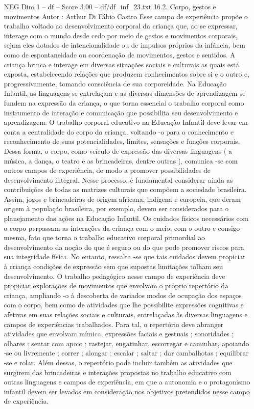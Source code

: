 \begin{textsample}{NEG Dim 1 – df – Score 3.00 – df/df\_inf\_23.txt}  \label{ex:f1_neg_161}
16.2.
Corpo, gestos e movimentos Autor : Arthur Di Fábio Castro Esse campo de experiência propõe o trabalho voltado ao desenvolvimento corporal da criança que, ao se expressar, interage com o mundo desde cedo por meio de gestos e movimentos corporais, sejam eles dotados de intencionalidade ou de impulsos próprios da infância, bem como de espontaneidade ou coordenação de movimentos, gestos e sentidos.
A criança brinca e interage em diversas situações sociais e culturais as quais está exposta, estabelecendo relações que produzem conhecimentos sobre si e o outro e, progressivamente, tomando consciência de sua corporeidade.
Na Educação Infantil, as linguagens se entrelaçam e as diversas dimensões de aprendizagem se fundem na expressão da criança, o que torna essencial o trabalho corporal como instrumento de interação e comunicação que possibilita seu desenvolvimento e aprendizagem.
O trabalho corporal educativo na Educação Infantil deve levar em conta a centralidade do corpo da criança, voltando -o para o conhecimento e reconhecimento de suas potencialidades, limites, sensações e funções corporais.
Dessa forma, o corpo, como veículo de expressão das diversas linguagens ( a música, a dança, o teatro e as brincadeiras, dentre outras ), comunica -se com outros campos de experiência, de modo a promover possibilidades de desenvolvimento integral.
Nesse processo, é fundamental considerar ainda as contribuições de todas as matrizes culturais que compõem a sociedade brasileira.
Assim, jogos e brincadeiras de origem africana, indígena e europeia, que deram origem à população brasileira, por exemplo, devem ser considerados para o planejamento das ações na Educação Infantil.
Os cuidados físicos necessários com o corpo perpassam as interações da criança com o meio, com o outro e consigo mesma, fato que torna o trabalho educativo corporal primordial ao desenvolvimento da noção do que é seguro ou do que pode promover riscos para sua integridade física.
No entanto, ressalta -se que tais cuidados devem propiciar à criança condições de expressão sem que supostas limitações tolham seu desenvolvimento.
O trabalho pedagógico nesse campo de experiência deve propiciar explorações de movimentos que envolvam o próprio repertório da criança, ampliando -o à descoberta de variados modos de ocupação dos espaços com o corpo, bem como de atividades que lhe possibilite expressões cognitivas e afetivas em suas relações sociais e culturais, entrelaçadas às diversas linguagens e campos de experiências trabalhados.
Para tal, o repertório deve abranger atividades que envolvam mímica, expressões faciais e gestuais ; sonoridades ; olhares ; sentar com apoio ; rastejar, engatinhar, escorregar e caminhar, apoiando -se ou livremente ; correr ; alongar ; escalar ; saltar ; dar cambalhotas ; equilibrar -se e rolar.
Além dessas, o repertório pode incluir também as atividades que surgirem das brincadeiras e interações propostas no trabalho educativo com outras linguagens e campos de experiência, em que a autonomia e o protagonismo infantil devem ser levados em consideração nos objetivos pretendidos nesse campo de experiência.

\end{textsample}
